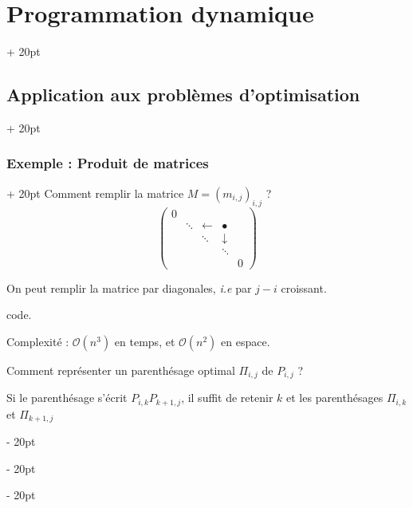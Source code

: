 \documentclass[a4paper, 12pt, twoside]{article}
\newcommand{\ind}[1][20pt]{\advance\leftskip + #1}
\newcommand{\deind}[1][20pt]{\advance\leftskip - #1}
\newenvironment{indt}[2][20pt]{#2 \par \ind[#1]}{\par \deind} %
\begin{document}
\begin{indt}{\section{Programmation dynamique}}
\begin{indt}{\subsection{Application aux problèmes d'optimisation}}
\begin{indt}{\subsubsection{Exemple : Produit de matrices}}
                Comment remplir la matrice $M = (m_{i,j})_{i,j}$ ?
                    \[
                        \begin{pmatrix}
                            0
                            \\
                            & \ddots & \leftarrow & \bullet
                            \\
                            & & \ddots & \downarrow
                            \\
                            & & & \ddots
                            \\
                            & & & & 0
                        \end{pmatrix}
                    \]
                
                On peut remplir la matrice par diagonales, \textit{i.e} par $j - i$ croissant.
                
                 code.
                
                \vspace{12pt}
                
                Complexité : $\mathcal O(n^3)$ en temps, et $\mathcal O(n^2)$ en espace.
                
                \vspace{12pt}
                
                Comment représenter un parenthésage optimal $\Pi_{i, j}$ de $P_{i, j}$ ?
                
                Si le parenthésage s'écrit $P_{i, k} P_{k + 1, j}$, il suffit de retenir $k$ et les parenthésages $\Pi_{i, k}$ et $\Pi_{k + 1, j}$
                
                \begin{center}
                \end{center}
            \end{indt}
        \end{indt}
        
    \end{indt}
    
    
    
\end{document}
